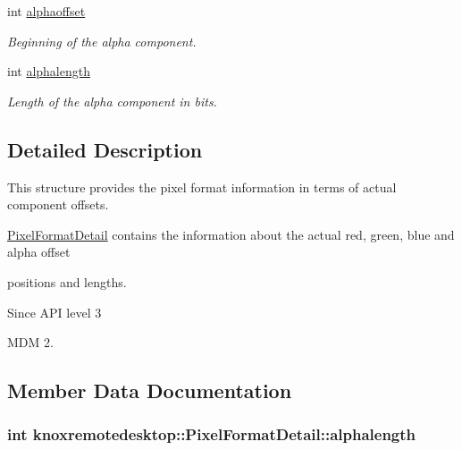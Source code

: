 \begin{DoxyCompactItemize}
int \hyperlink{structknoxremotedesktop_1_1PixelFormatDetail_a4cfaeee3077ff3609b0d7a5aab4e5a83}{alphaoffset}
\begin{DoxyCompactList}\small\item\em \-Beginning of the alpha component. \end{DoxyCompactList}\item 
int \hyperlink{structknoxremotedesktop_1_1PixelFormatDetail_a2e62bca1625dfeefebd537dd0678627d}{alphalength}
\begin{DoxyCompactList}\small\item\em \-Length of the alpha component in bits. \end{DoxyCompactList}\end{DoxyCompactItemize}


\subsection{\-Detailed \-Description}
\-This structure provides the pixel format information in terms of actual component offsets. 

\hyperlink{structknoxremotedesktop_1_1PixelFormatDetail}{\-Pixel\-Format\-Detail} contains the information about the actual red, green, blue and alpha offset

positions and lengths.

\begin{DoxySince}{\-Since}
\-A\-P\-I level 3

\-M\-D\-M 2. 
\end{DoxySince}


\subsection{\-Member \-Data \-Documentation}
\hypertarget{structknoxremotedesktop_1_1PixelFormatDetail_a2e62bca1625dfeefebd537dd0678627d}{
\subsubsection[{alphalength}]{\setlength{\rightskip}{0pt plus 5cm}int {\bf knoxremotedesktop\-::\-Pixel\-Format\-Detail\-::alphalength}}}\label{structknoxremotedesktop_1_1PixelFormatDetail_a2e62bca1625dfeefebd537dd0678627d}


